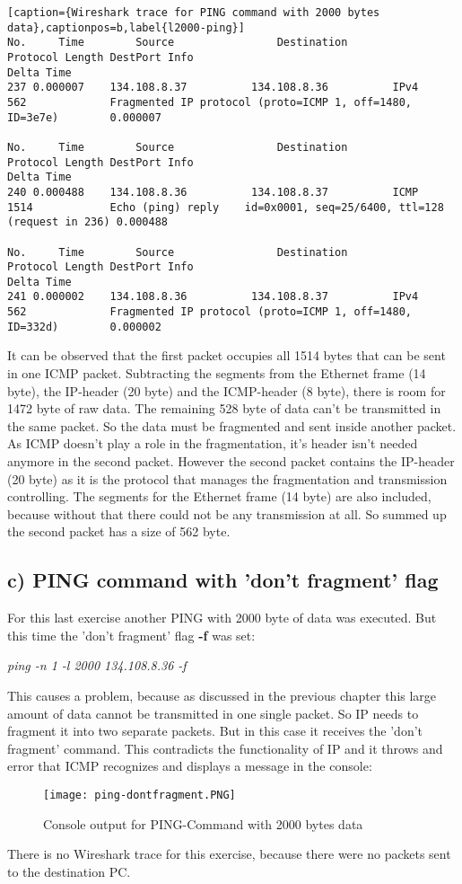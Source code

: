 \begin{lstlisting}[caption={Wireshark trace for PING command with 2000 bytes data},captionpos=b,label{l2000-ping}]
No.     Time        Source                Destination           Protocol Length DestPort Info                                                            Delta Time
237 0.000007    134.108.8.37          134.108.8.36          IPv4     562             Fragmented IP protocol (proto=ICMP 1, off=1480, ID=3e7e)        0.000007
	
No.     Time        Source                Destination           Protocol Length DestPort Info                                                            Delta Time
240 0.000488    134.108.8.36          134.108.8.37          ICMP     1514            Echo (ping) reply    id=0x0001, seq=25/6400, ttl=128 (request in 236) 0.000488
	
No.     Time        Source                Destination           Protocol Length DestPort Info                                                            Delta Time
241 0.000002    134.108.8.36          134.108.8.37          IPv4     562             Fragmented IP protocol (proto=ICMP 1, off=1480, ID=332d)        0.000002
\end{lstlisting}

It can be observed that the first packet occupies all 1514 bytes that can be sent in one ICMP packet. Subtracting the segments from the Ethernet frame (14 byte), the IP-header (20 byte) and the ICMP-header (8 byte), there is room for 1472 byte of raw data. The remaining 528 byte of data can't be transmitted in the same packet. So the data must be fragmented and sent inside another packet. As ICMP doesn't play a role in the fragmentation, it's header isn't needed anymore in the second packet. However the second packet contains the IP-header (20 byte) as it is the protocol that manages the fragmentation and transmission controlling. The segments for the Ethernet frame (14 byte) are also included, because without that there could not be any transmission at all. So summed up the second packet has a size of 562 byte.
\subsection{c) PING command with 'don't fragment' flag}
For this last exercise another PING with 2000 byte of data was executed. But this time the 'don't fragment' flag \textbf{-f} was set:
\begin{center}
	\textit{ping -n 1 -l 2000 134.108.8.36 -f}
\end{center}
This causes a problem, because as discussed in the previous chapter this large amount of data cannot be transmitted in one single packet. So IP needs to fragment it into two separate packets. But in this case it receives the 'don't fragment' command. This contradicts the functionality of IP and it throws and error that ICMP recognizes and displays a message in the console:
\begin{figure}[H]
	\centering
	\texttt{[image: ping-dontfragment.PNG]}
	\caption{Console output for PING-Command with 2000 bytes data}
	\label{ping-dontfragment}
\end{figure} 
There is no Wireshark trace for this exercise, because there were no packets sent to the destination PC.
